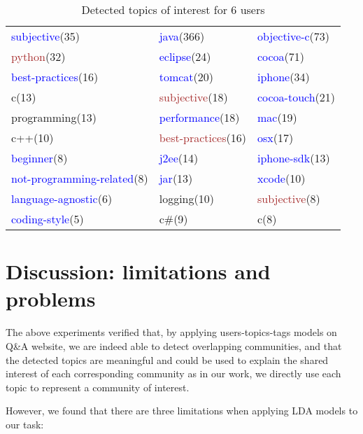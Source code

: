 \begin{sidewaystable}
\begin{tabular}{|l|l|l|}
\hline
\textcolor{blue}{subjective}(35)&\textcolor{blue}{java}(366)&\textcolor{blue}{objective-c}(73)\\
\textcolor{brown}{python}(32)&\textcolor{blue}{eclipse}(24)&\textcolor{blue}{cocoa}(71)\\
\textcolor{blue}{best-practices}(16)&\textcolor{blue}{tomcat}(20)&\textcolor{blue}{iphone}(34)\\
c(13)&\textcolor{brown}{subjective}(18)&\textcolor{blue}{cocoa-touch}(21)\\
programming(13)&\textcolor{blue}{performance}(18)&\textcolor{blue}{mac}(19)\\
c++(10)&\textcolor{brown}{best-practices}(16)&\textcolor{blue}{osx}(17)\\
\textcolor{blue}{beginner}(8)&\textcolor{blue}{j2ee}(14)&\textcolor{blue}{iphone-sdk}(13)\\
\textcolor{blue}{not-programming-related}(8)&\textcolor{blue}{jar}(13)&\textcolor{blue}{xcode}(10)\\
\textcolor{blue}{language-agnostic}(6)&logging(10)&\textcolor{brown}{subjective}(8)\\
\textcolor{blue}{coding-style}(5)&c\#(9)&c(8)\\
\hline
\end{tabular}
\caption{Detected topics of interest for 6 users}
\label{tab:ldaresult2}
\end{sidewaystable}

\section{Discussion: limitations and problems}
The above experiments verified that, by applying users-topics-tags models on Q\&A website, we are indeed able to detect overlapping communities, and that the detected topics are meaningful and could be used to explain the shared interest of each corresponding community as in our work, we directly use each topic to represent a community of interest.

However, we found that there are three limitations when applying LDA models to our task:

